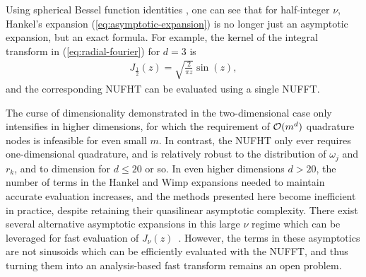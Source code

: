 Using spherical Bessel function identities \cite[10.47.3,
10.49.2]{olver2010nist}, one can see that for half-integer $\nu$, Hankel's
expansion (\ref{eq:asymptotic-expansion}) is no longer just an asymptotic
expansion, but an exact formula.
For example, the kernel of the integral transform in (\ref{eq:radial-fourier})
for $d = 3$ is
\begin{align}
  J_{\frac{1}{2}}(z) = \sqrt{\frac{2}{\pi z}} \sin(z),
\end{align}
and the corresponding NUFHT can be evaluated using a single NUFFT.

The curse of dimensionality demonstrated in the two-dimensional case only
intensifies in higher dimensions, for which the requirement of $\mathcal{O}(m^d)$
quadrature nodes is infeasible for even small $m$. In contrast, the NUFHT only
ever requires one-dimensional quadrature, and is relatively robust to the
distribution of $\omega_j$ and $r_k$, and to dimension for $d \leq 20$ or so. In
even higher dimensions $d > 20$, the number of terms in the Hankel and Wimp
expansions needed to maintain accurate evaluation increases, and the methods
presented here become inefficient in practice, despite retaining their
quasilinear asymptotic complexity. There exist several alternative asymptotic
expansions in this large $\nu$ regime which can be leveraged for fast evaluation
of $J_\nu(z)$~\cite{heitman2015asymptotics, olver2010nist}.
However, the terms in these asymptotics are not sinusoids which can be
efficiently evaluated with the NUFFT, and thus turning them into an
analysis-based fast transform remains an open problem.
